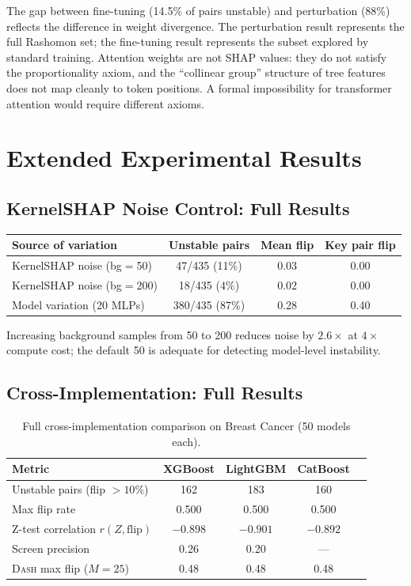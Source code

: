\documentclass{article}
\newcommand{\DASH}{\textsc{Dash}}
\begin{document}
The gap between fine-tuning (14.5\% of pairs unstable) and perturbation (88\%) reflects the difference in weight divergence. The perturbation result represents the full Rashomon set; the fine-tuning result represents the subset explored by standard training. Attention weights are not SHAP values: they do not satisfy the proportionality axiom, and the ``collinear group'' structure of tree features does not map cleanly to token positions. A formal impossibility for transformer attention would require different axioms.

\section{Extended Experimental Results}

\subsection{KernelSHAP Noise Control: Full Results}

\begin{center}
\small
\begin{tabular}{@{}lccc@{}}
\toprule
Source of variation & Unstable pairs & Mean flip & Key pair flip \\
\midrule
KernelSHAP noise (bg$=$50) & 47/435 (11\%) & 0.03 & 0.00 \\
KernelSHAP noise (bg$=$200) & 18/435 (4\%) & 0.02 & 0.00 \\
Model variation (20 MLPs) & 380/435 (87\%) & 0.28 & 0.40 \\
\bottomrule
\end{tabular}
\end{center}

Increasing background samples from 50 to 200 reduces noise by $2.6\times$ at $4\times$ compute cost; the default 50 is adequate for detecting model-level instability.

\subsection{Cross-Implementation: Full Results}

\begin{table}[t]
\centering
\caption{Full cross-implementation comparison on Breast Cancer (50 models each).}
\small
\begin{tabular}{@{}lcccc@{}}
\toprule
Metric & XGBoost & LightGBM & CatBoost \\
\midrule
Unstable pairs (flip $> 10\%$) & 162 & 183 & 160 \\
Max flip rate & 0.500 & 0.500 & 0.500 \\
Z-test correlation $r(Z, \text{flip})$ & $-0.898$ & $-0.901$ & $-0.892$ \\
Screen precision & 0.26 & 0.20 & --- \\
\DASH{} max flip ($M{=}25$) & 0.48 & 0.48 & 0.48 \\
\bottomrule
\end{tabular}
\end{table}
\end{document}
